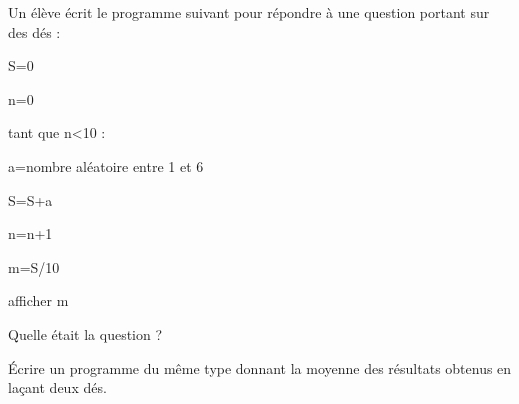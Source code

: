 
\begin{exercice}\label{exosmath-0554}

    Un élève écrit le programme suivant pour répondre à une question portant sur des dés :

\begin{fmpage}{0.9\linewidth}

    S=0

    n=0

    tant que n<10 :

    \hspace{1cm} a=nombre aléatoire entre 1 et 6

    \hspace{1cm} S=S+a

    \hspace{1cm} n=n+1

    m=S/10

    afficher m

\end{fmpage}

Quelle était la question ?

Écrire un programme du même type donnant la moyenne des résultats obtenus en laçant deux dés.

\end{exercice}
